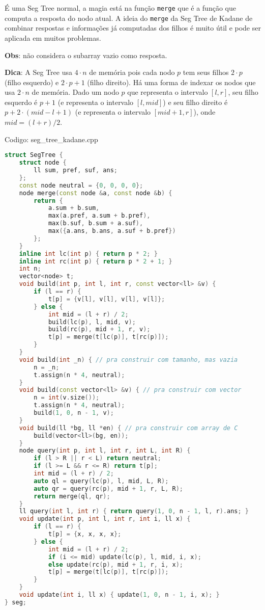 \documentclass[10pt, a4paper, oneside]{book}
\begin{document}
É uma Seg Tree normal, a magia está na função \texttt{merge} que é a função que computa a resposta do nodo atual. A ideia do \texttt{merge} da Seg Tree de Kadane de combinar respostas e informações já computadas dos filhos é muito útil e pode ser aplicada em muitos problemas.



\textbf{Obs}: não considera o subarray vazio como resposta.



\textbf{Dica}: A Seg Tree usa $4 \cdot n$ de memória pois cada nodo $p$ tem seus filhos $2 \cdot p$ (filho esquerdo) e $2 \cdot p + 1$ (filho direito). Há uma forma de indexar os nodos que usa $2 \cdot n$ de memória. Dado um nodo $p$ que representa o intervalo $[l, r]$, seu filho esquerdo é $p+1$ (e representa o intervalo $[l, mid]$) e seu filho direito é $p+2 \cdot (mid-l+1)$ (e representa o intervalo $[mid+1, r]$), onde $mid = (l+r)/2$.
\hfill

Codigo: seg\_tree\_kadane.cpp

\begin{lstlisting}[language=C++]
struct SegTree {
    struct node {
        ll sum, pref, suf, ans;
    };
    const node neutral = {0, 0, 0, 0};
    node merge(const node &a, const node &b) {
        return {
            a.sum + b.sum,
            max(a.pref, a.sum + b.pref),
            max(b.suf, b.sum + a.suf),
            max({a.ans, b.ans, a.suf + b.pref})
        };
    }
    inline int lc(int p) { return p * 2; }
    inline int rc(int p) { return p * 2 + 1; }
    int n;
    vector<node> t;
    void build(int p, int l, int r, const vector<ll> &v) {
        if (l == r) {
            t[p] = {v[l], v[l], v[l], v[l]};
        } else {
            int mid = (l + r) / 2;
            build(lc(p), l, mid, v);
            build(rc(p), mid + 1, r, v);
            t[p] = merge(t[lc(p)], t[rc(p)]);
        }
    }
    void build(int _n) { // pra construir com tamanho, mas vazia
        n = _n;
        t.assign(n * 4, neutral);
    }
    void build(const vector<ll> &v) { // pra construir com vector
        n = int(v.size());
        t.assign(n * 4, neutral);
        build(1, 0, n - 1, v);
    }
    void build(ll *bg, ll *en) { // pra construir com array de C
        build(vector<ll>(bg, en));
    }
    node query(int p, int l, int r, int L, int R) {
        if (l > R || r < L) return neutral;
        if (l >= L && r <= R) return t[p];
        int mid = (l + r) / 2;
        auto ql = query(lc(p), l, mid, L, R);
        auto qr = query(rc(p), mid + 1, r, L, R);
        return merge(ql, qr);
    }
    ll query(int l, int r) { return query(1, 0, n - 1, l, r).ans; }
    void update(int p, int l, int r, int i, ll x) {
        if (l == r) {
            t[p] = {x, x, x, x};
        } else {
            int mid = (l + r) / 2;
            if (i <= mid) update(lc(p), l, mid, i, x);
            else update(rc(p), mid + 1, r, i, x);
            t[p] = merge(t[lc(p)], t[rc(p)]);
        }
    }
    void update(int i, ll x) { update(1, 0, n - 1, i, x); }
} seg;
\end{lstlisting}
\hfill
\end{document}
